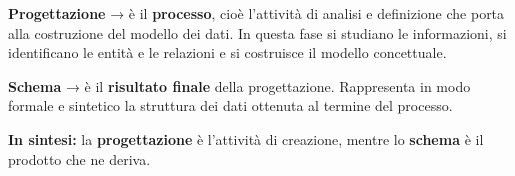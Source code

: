\begin{tcolorbox}[colback=white, colframe=red!70!black, title=\textbf{Differenza tra Progettazione e Schema}, coltitle=black]

\textbf{Progettazione} → è il \textbf{processo}, cioè l’attività di analisi e definizione che porta alla costruzione del modello dei dati.  
In questa fase si studiano le informazioni, si identificano le entità e le relazioni e si costruisce il modello concettuale.

\textbf{Schema} → è il \textbf{risultato finale} della progettazione.  
Rappresenta in modo formale e sintetico la struttura dei dati ottenuta al termine del processo.

\medskip
\textcolor{red!80!black}{\textbf{In sintesi:}}  
la \textbf{progettazione} è l’attività di creazione,  
mentre lo \textbf{schema} è il prodotto che ne deriva.
\end{tcolorbox}
